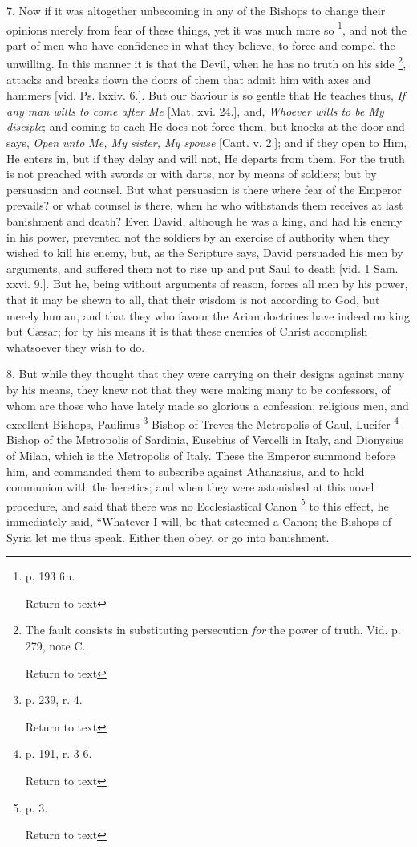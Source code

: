 7. Now if it was altogether unbecoming in any of
the Bishops to change their opinions merely from fear of these things,
yet it was much more so \footnote{p. 193 fin.

Return to text},
and not the part of men who have confidence in what they believe, to
force and compel the unwilling. In this manner it is that the Devil,
when he has no truth on his side \footnote{The fault consists in substituting persecution \emph{for} the power of
truth. Vid. p. 279, note C.

Return to text

}, attacks and breaks down the doors of them that admit him with
axes and hammers [vid. Ps. lxxiv. 6.]. But our Saviour is so gentle
that He teaches thus, \emph{If any man wills to come after Me} [Mat.
xvi. 24.], and, \emph{Whoever wills to be My disciple}; and coming to
each He does not force them, but knocks at the door and says, \emph{Open
unto Me, My sister, My spouse} [Cant. v. 2.]; and if they open to
Him, He enters in, but if they delay and will not, He departs from
them. For the truth is not preached with swords or with darts, nor by
means of soldiers; but by persuasion and counsel. But what persuasion
is there where fear of the Emperor prevails? or what counsel is there,
when he who withstands them receives at last banishment and
death? Even David, although he was a king, and had his enemy in his
power, prevented not the soldiers by an exercise of authority when
they wished to kill his enemy, but, as the Scripture says, David
persuaded his men by arguments, and suffered them not to rise up and
put Saul to death [vid. 1 Sam. xxvi. 9.]. But he, being without
arguments of reason, forces all men by his power, that it may be shewn
to all, that their wisdom is not according to God, but merely human,
and that they who favour the Arian doctrines have indeed no king but Cæsar;
for by his means it is that these enemies of Christ accomplish
whatsoever they wish to do.

8. But while they thought that they were carrying
on their designs against many by his means, they knew not that they
were making many to be confessors, of whom are those who have lately
made so glorious a confession, religious men, and excellent Bishops,
Paulinus \footnote{p. 239, r. 4.

Return to text} Bishop of
Treves the Metropolis of Gaul, Lucifer \footnote{p. 191, r. 3-6.

Return to text} Bishop of the Metropolis of Sardinia, Eusebius of Vercelli in
Italy, and Dionysius of Milan, which is the Metropolis of Italy. These
the Emperor summond before him, and commanded them to subscribe
against Athanasius, and to hold communion with the heretics; and when
they were astonished at this novel procedure, and said that there was
no Ecclesiastical Canon \footnote{p. 3.

Return to text}
to this effect, he immediately said, ``Whatever I will, be that
esteemed a Canon; the Bishops of Syria let me thus speak. Either then
obey, or go into banishment.

